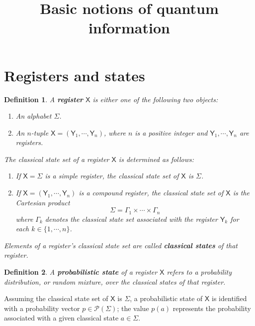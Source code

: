 \documentclass[aps,pra,onecolumn,notitlepage,superscriptaddress]{revtex4-1}
\newcommand{\reg}[1]{\mathsf{#1}}
\newcommand{\spc}[1]{\mathcal{#1}}
\newtheorem{defi}{Definition}
\begin{document}
    \title{Basic notions of quantum information}
    \author{}
    \maketitle

    \section{Registers and states}
    \begin{defi}
        A \textbf{register} $\reg X$ is either one of the following two objects:
        \begin{enumerate}
            \item An alphabet $\Sigma$.
            \item An $n$-tuple $\reg X = (\reg Y_1, \cdots, \reg Y_n)$, where $n$ is a positive integer and $\reg Y_1, \cdots, \reg Y_n$ are registers.
        \end{enumerate}

        The classical state set of a register $\reg X$ is determined as follows:
        \begin{enumerate}
            \item If $\reg X = \Sigma$ is a simple register, the classical state set of $\reg X$ is $\Sigma$.
            \item  If $\reg X = (\reg Y_1, \cdots, \reg Y_n)$ is a compound register, the classical state set of $\reg X$ is the Cartesian product
            \begin{equation}
                \Sigma = \Gamma_1 \times \cdots \times \Gamma_n
            \end{equation}
            where $\Gamma_k$ denotes the classical state set associated with the register $\reg Y_k$ for each $k \in \{1, \cdots ,n\}$.
        \end{enumerate}

        Elements of a register's classical state set are called \textbf{classical states} of that register.
    \end{defi}

    \begin{defi}
        A \textbf{probabilistic state} of a register $\reg X$ refers to a probability distribution, or random mixture, over the classical states of that register. 
    \end{defi}

    Assuming the classical state set of $\reg X$ is $\Sigma$, a probabilistic state of $\reg X$ is identified with a probability vector $p \in \spc P(\Sigma)$; the value $p(a)$ represents the probability associated with a given classical state $a \in \Sigma$. 
\end{document}

